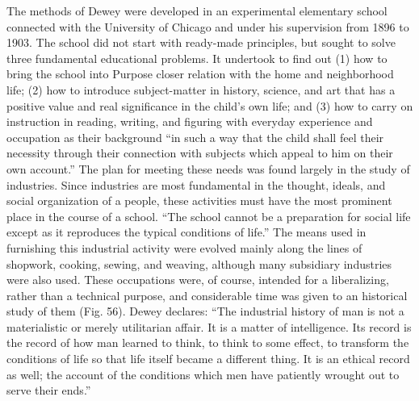 \documentclass[]{book}
\begin{document}
The methods of Dewey were developed in an experimental elementary school connected with the University of Chicago and under his supervision from 1896 to 1903. The school did not start with ready-made principles, but sought to solve three fundamental educational problems. It undertook to find out (1) how to bring the school into Purpose closer relation with the home and neighborhood life; (2) how to introduce subject-matter in history, science, and art that has a positive value and real significance in the child's own life; and (3) how to carry on instruction in reading, writing, and figuring with everyday experience and occupation as their background ``in such a way that the child shall feel their necessity through their connection with subjects which appeal to him on their own account.'' The plan for meeting these needs was found largely in the study of industries. Since industries are most fundamental in the thought, ideals, and social organization of a people, these activities must have the most prominent place in the course of a school. ``The school cannot be a preparation for social life except as it reproduces the typical conditions of life.'' The means used in furnishing this industrial activity were evolved mainly along the lines of shopwork, cooking, sewing, and weaving, although many subsidiary industries were also used. These occupations were, of course, intended for a liberalizing, rather than a technical purpose, and considerable time was given to an historical study of them (Fig. 56). Dewey declares: ``The industrial history of man is not a materialistic or merely utilitarian affair. It is a matter of intelligence. Its record is the record of how man learned to think, to think to some effect, to transform the conditions of life so that life itself became a different thing. It is an ethical record as well; the account of the conditions which men have patiently wrought out to serve their ends.''
\end{document}
